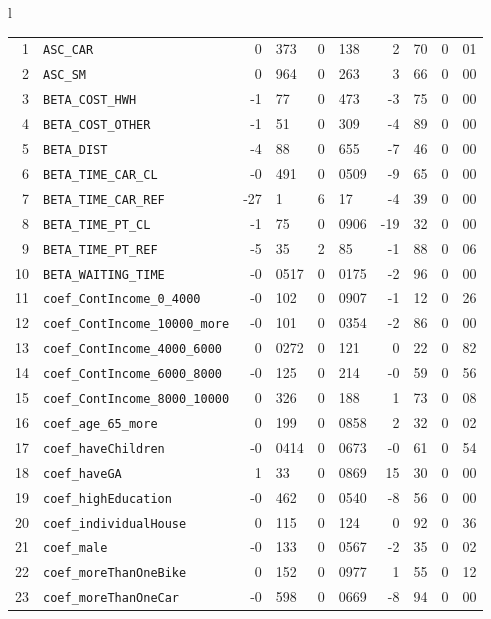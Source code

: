 \documentclass[12pt,a4paper]{article}
\begin{document}
\begin{table}[htb]
\begin{tabular}{l}
\begin{tabular}{rlr@{.}lr@{.}lr@{.}lr@{.}l}
1 & \lstinline$ASC_CAR$ & 0&373 & 0&138 & 2&70 & 0&01\\
2 & \lstinline$ASC_SM$ & 0&964 & 0&263 & 3&66 & 0&00\\
3 & \lstinline$BETA_COST_HWH$ & -1&77 & 0&473 & -3&75 & 0&00\\
4 & \lstinline$BETA_COST_OTHER$ & -1&51 & 0&309 & -4&89 & 0&00\\
5 & \lstinline$BETA_DIST$ & -4&88 & 0&655 & -7&46 & 0&00\\
6 & \lstinline$BETA_TIME_CAR_CL$ & -0&491 & 0&0509 & -9&65 & 0&00\\
7 & \lstinline$BETA_TIME_CAR_REF$ & -27&1 & 6&17 & -4&39 & 0&00\\
8 & \lstinline$BETA_TIME_PT_CL$ & -1&75 & 0&0906 & -19&32 & 0&00\\
9 & \lstinline$BETA_TIME_PT_REF$ & -5&35 & 2&85 & -1&88 & 0&06\\
10 & \lstinline$BETA_WAITING_TIME$ & -0&0517 & 0&0175 & -2&96 & 0&00\\
11 & \lstinline$coef_ContIncome_0_4000$ & -0&102 & 0&0907 & -1&12 & 0&26\\
12 & \lstinline$coef_ContIncome_10000_more$ & -0&101 & 0&0354 & -2&86 & 0&00\\
13 & \lstinline$coef_ContIncome_4000_6000$ & 0&0272 & 0&121 & 0&22 & 0&82\\
14 & \lstinline$coef_ContIncome_6000_8000$ & -0&125 & 0&214 & -0&59 & 0&56\\
15 & \lstinline$coef_ContIncome_8000_10000$ & 0&326 & 0&188 & 1&73 & 0&08\\
16 & \lstinline$coef_age_65_more$ & 0&199 & 0&0858 & 2&32 & 0&02\\
17 & \lstinline$coef_haveChildren$ & -0&0414 & 0&0673 & -0&61 & 0&54\\
18 & \lstinline$coef_haveGA$ & 1&33 & 0&0869 & 15&30 & 0&00\\
19 & \lstinline$coef_highEducation$ & -0&462 & 0&0540 & -8&56 & 0&00\\
20 & \lstinline$coef_individualHouse$ & 0&115 & 0&124 & 0&92 & 0&36\\
21 & \lstinline$coef_male$ & -0&133 & 0&0567 & -2&35 & 0&02\\
22 & \lstinline$coef_moreThanOneBike$ & 0&152 & 0&0977 & 1&55 & 0&12\\
23 & \lstinline$coef_moreThanOneCar$ & -0&598 & 0&0669 & -8&94 & 0&00\\
\hline
\end{tabular}
\\
\begin{tabular}{rcl}

\end{tabular}
\end{tabular}
\end{table}
\end{document}
